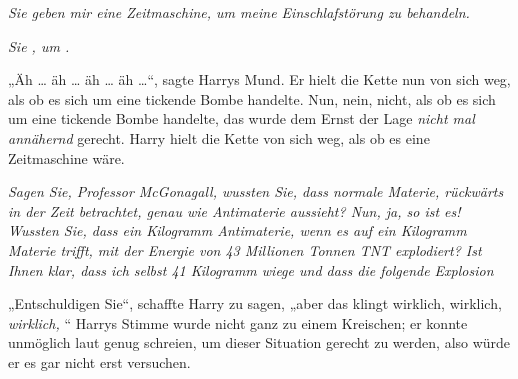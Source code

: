 \emph{Sie geben mir eine \emph{Zeitmaschine}, um meine \emph{Einschlafstörung} zu behandeln.}

\emph{Sie , um .}

„Äh … äh … äh … äh …“, sagte Harrys Mund. Er hielt die Kette nun von sich weg, als ob es sich um eine tickende Bombe handelte. Nun, nein, nicht, als ob es sich um eine tickende Bombe handelte, das wurde dem Ernst der Lage \emph{nicht mal annähernd} gerecht. Harry hielt die Kette von sich weg, als ob es eine Zeitmaschine wäre.

\emph{Sagen Sie, Professor McGonagall, wussten Sie, dass normale Materie, rückwärts in der Zeit betrachtet, genau wie Antimaterie aussieht? Nun, ja, so ist es! Wussten Sie, dass ein Kilogramm Antimaterie, wenn es auf ein Kilogramm Materie trifft, mit der Energie von 43 Millionen Tonnen TNT explodiert? Ist Ihnen klar, dass ich selbst 41 Kilogramm wiege und dass die folgende Explosion }%

„Entschuldigen Sie“, schaffte Harry zu sagen, „aber das klingt wirklich, wirklich, \emph{wirklich, }“ Harrys Stimme wurde nicht ganz zu einem Kreischen; er konnte unmöglich laut genug schreien, um dieser Situation gerecht zu werden, also würde er es gar nicht erst versuchen.

